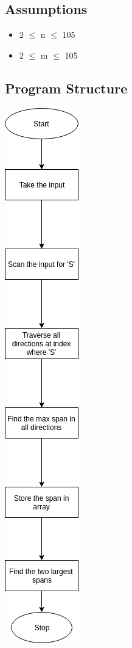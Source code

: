 \documentclass{article}
\begin{document}
\subsection{Assumptions}
\begin{itemize}
\item 2 $\leq$ n $\leq$ 105
\item 2 $\leq$ m $\leq$ 105
  \end{itemize}
\subsection{Program Structure}
\includegraphics[scale=0.4]{ps1c}
\end{document}
